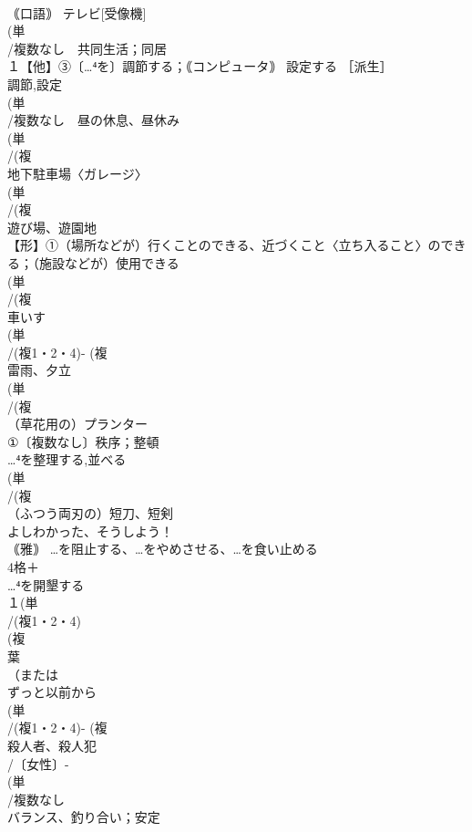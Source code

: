 \documentclass[8pt]{extreport}
\begin{document}
\begin{CJK}{UTF8}{min}
\\	｟口語｠ テレビ[受像機] 
\\	(単
\\	/複数なし　共同生活；同居 
\\	１【他】③〔…⁴を〕調節する；｟コンピュータ｠ 設定する ［派生］ 
\\	調節,設定
\\	(単
\\	/複数なし　昼の休息、昼休み 
\\	(単
\\	/(複
\\	地下駐車場〈ガレージ〉 
\\	(単
\\	/(複
\\	遊び場、遊園地 
\\	【形】①（場所などが）行くことのできる、近づくこと〈立ち入ること〉のできる；（施設などが）使用できる
\\	(単
\\	/(複
\\	車いす 
\\	(単
\\	/(複1・2・4)- (複
\\	雷雨、夕立 
\\	(単
\\	/(複
\\	（草花用の）プランター 
\\	①〔複数なし〕秩序；整頓 
\\	…⁴を整理する,並べる
\\	(単
\\	/(複
\\	（ふつう両刃の）短刀、短剣 
\\	よしわかった、そうしよう！
\\	｟雅｠ …を阻止する、…をやめさせる、…を食い止める
\\	4格＋
\\	…⁴を開墾する
\\	１(単
\\	/(複1・2・4)
\\	(複
\\	葉 
\\	（または
\\	ずっと以前から
\\	(単
\\	/(複1・2・4)- (複
\\	殺人者、殺人犯 
\\	/〔女性〕-
\\	(単
\\	/複数なし 
\\	バランス、釣り合い；安定 

\end{CJK}
\end{document}
